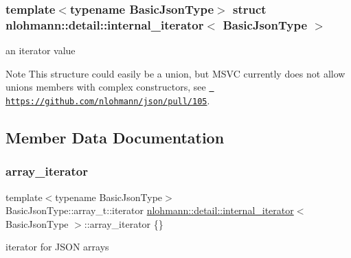 \subsubsection*{template$<$typename Basic\+Json\+Type$>$\newline
struct nlohmann\+::detail\+::internal\+\_\+iterator$<$ Basic\+Json\+Type $>$}

an iterator value 

\begin{DoxyNote}{Note}
This structure could easily be a union, but M\+S\+VC currently does not allow unions members with complex constructors, see \href{https://github.com/nlohmann/json/pull/105}{\texttt{ https\+://github.\+com/nlohmann/json/pull/105}}. 
\end{DoxyNote}


\subsection{Member Data Documentation}
\mbox{\label{structnlohmann_1_1detail_1_1internal__iterator_a8294a6e6f01b58e1cce8fbae66a50b5d}} 
\subsubsection{\texorpdfstring{array\_iterator}{array\_iterator}}
{\footnotesize\ttfamily template$<$typename Basic\+Json\+Type$>$ \\
Basic\+Json\+Type\+::array\+\_\+t\+::iterator \mbox{\hyperlink{structnlohmann_1_1detail_1_1internal__iterator}{nlohmann\+::detail\+::internal\+\_\+iterator}}$<$ Basic\+Json\+Type $>$\+::array\+\_\+iterator \{\}}



iterator for J\+S\+ON arrays 

\mbox{\label{structnlohmann_1_1detail_1_1internal__iterator_a8cb0af3498061426c1d0a65ad6220408}} 
